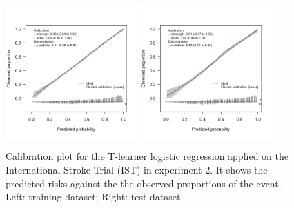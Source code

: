 \begin{figure}[htbp]
\centering
\includegraphics[width=0.45\textwidth]{img/results_IST/glm_tlearner_train_calibration_plot.png}
\includegraphics[width=0.45\textwidth]{img/results_IST/glm_tlearner_test_calibration_plot.png}
\caption{Calibration plot for the T-learner logistic regression applied on the International Stroke Trial (IST) in experiment 2. It shows the predicted risks against the the observed proportions of the event. Left: training dataset; Right: test dataset.}
\label{fig:calibration_IST_glm}
\end{figure}


